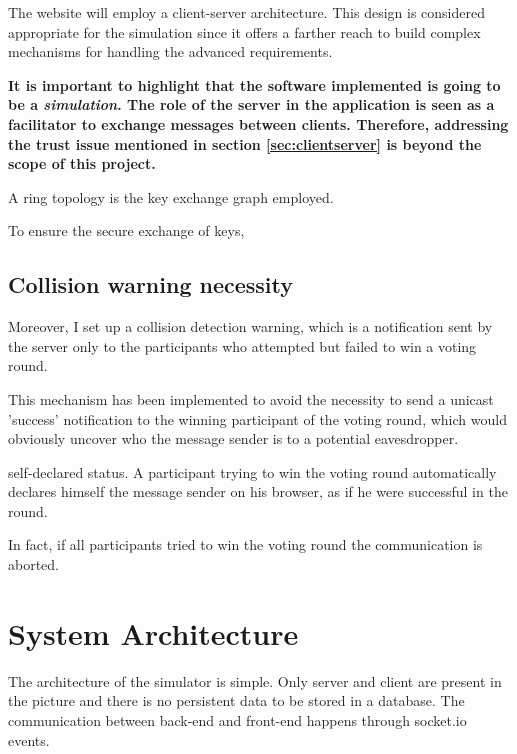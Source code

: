 The website will employ a client-server architecture. This design is considered appropriate for the simulation since it offers a farther reach to build complex mechanisms for handling the advanced requirements.

\textbf{It is important to highlight that the software implemented is going to be a \emph{simulation}. The role of the server in the application is seen as a facilitator to exchange messages between clients. Therefore, addressing the trust issue mentioned in section \ref{sec:clientserver} is beyond the scope of this project.}

A ring topology is the key exchange graph employed.


To ensure the secure exchange of keys, 




\subsection{Collision warning necessity}
Moreover, I set up a collision detection warning, which is a notification sent by the server only to the participants who attempted but failed to win a voting round. 

This mechanism has been implemented to avoid the necessity to send a unicast 'success' notification to the winning participant of the voting round, which would obviously uncover who the message sender is to a potential eavesdropper.


self-declared status. 
A participant trying to win the voting round automatically declares himself the message sender on his browser, as if he were successful in the round. 


In fact, if all participants tried to win the voting round the communication is aborted.


\section{System Architecture}
The architecture of the simulator is simple. Only server and client are present in the picture and there is no persistent data to be stored in a database. The communication between back-end and front-end happens through socket.io events.

